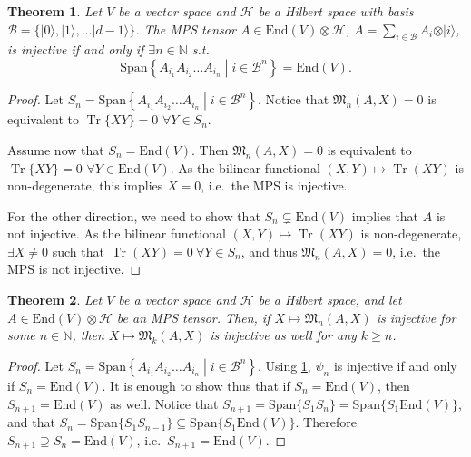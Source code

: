 \documentclass{article}
\newtheorem{theorem}{Theorem}
\newcommand{\tr}{\operatorname{Tr}}
\newcommand{\End}{\mathrm{End}}
\newcommand{\ket}[1]{\vert #1 \rangle}
\newcommand{\Span}{\mathrm{Span}}
\begin{document}
\begin{theorem}\label{thm:injectivity_equivalent}
  Let $V$ be a vector space and $\mathcal{H}$ be a Hilbert space with basis $\mathcal{B} = \{\ket{0},\ket{1},\dots \ket{d-1}\}$. The MPS tensor $A\in \End(V)\otimes \mathcal{H}$, $A = \sum_{i\in \mathcal{B}} A_i \otimes \ket{i}$, is injective if and only if $\exists n\in \mathbb{N}$ s.t.
  \begin{equation*}
  	\Span\left\{A_{i_1} A_{i_2} \dots A_{i_n} \middle| i\in \mathcal{B}^n \right\} = \End(V).
  \end{equation*}
\end{theorem}

\begin{proof}
	Let $S_n = \Span\left\{A_{i_1} A_{i_2} \dots A_{i_n} \middle| i\in \mathcal{B}^n \right\}$. Notice that $\mathfrak{M}_n(A,X)=0$ is equivalent to $\tr\{XY\} = 0$ $\forall Y\in S_n$.
  
  Assume now that $S_n = \End(V)$. Then $\mathfrak{M}_n(A,X) = 0$ is equivalent to $\tr \{XY\} = 0 $ $\forall Y\in \End(V)$. As the bilinear functional $(X,Y)\mapsto \tr (XY)$ is non-degenerate, this implies $X=0$, i.e.\ the MPS is injective.
  
  For the other direction, we need to show that $S_n\subsetneq \End(V)$ implies that $A$ is not injective. As the bilinear functional $(X,Y)\mapsto \tr (XY)$ is non-degenerate, $\exists X\neq 0$ such that $\tr (XY) = 0 \ \forall Y\in S_n$, and thus $\mathfrak{M}_n(A,X) = 0$, i.e.\ the MPS is not injective.
\end{proof}


\begin{theorem}
  Let $V$ be a vector space and $\mathcal{H}$ be a Hilbert space, and let $A\in \End(V)\otimes \mathcal{H}$ be an MPS tensor. Then, if $X\mapsto\mathfrak{M}_n(A,X)$ is injective for some $n\in\mathbb{N}$, then $X \mapsto \mathfrak{M}_k(A,X)$ is injective as well for any $k\geq n$.
\end{theorem}

\begin{proof}
  Let $S_n = \Span\left\{A_{i_1} A_{i_2} \dots A_{i_n} \middle| i\in \mathcal{B}^n \right\}$. Using \cref{thm:injectivity_equivalent}, $\psi_n$ is injective if and only if $S_n = \End(V)$. It is enough to show thus that if $S_n = \End(V)$, then $S_{n+1} = \End(V)$ as well. Notice that $S_{n+1} = \Span\{S_1 S_n\} = \Span\{ S_1 \End(V)\}$, and that $S_{n} = \Span\{S_1 S_{n-1}\} \subseteq \Span\{S_1 \End(V)\}$. Therefore $S_{n+1} \supseteq S_n = \End(V)$, i.e.\ $S_{n+1} = \End(V)$. 
\end{proof}
\end{document}

